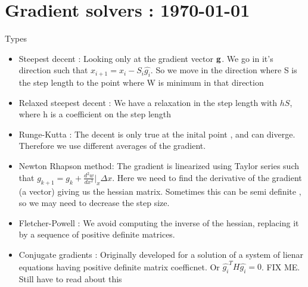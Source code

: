 




	\tableofcontents
	
\section{Gradient solvers : \today}

	\begin{frame}{Types}
		\begin{itemize}
			
			\item Steepest decent : Looking only at the gradient vector $\mathbf{g}$. We go in it's direction such that $ x_{i+1} = x_i - S_i \hat{g_i}$. So we move in the direction where S is the step length to the point where W is minimum in that direction
			\item Relaxed steepest decent : We have a relaxation in the step length with $hS$, where h is a coefficient on the step length
			\item Runge-Kutta : The decent is only true at the inital point , and can diverge. Therefore we use different averages of the gradient.
			\item Newton Rhapson method: The gradient is linearized using Taylor series such that $g_{k+1} = g_k + \frac{d^{2} w}{dx^{2}}|_x \Delta x$. Here we need to find the derivative of the gradient (a vector) giving us the hessian matrix. Sometimes this can be semi definite , so we may need to decrease the step size. 
			\item Fletcher-Powell : We avoid computing the inverse of the hessian, replacing it by a sequence of positive definite matrices. 
			\item Conjugate gradients : Originally developed for a solution of a system of lienar equations having positive definite matrix coefficnet. Or $\hat{g_i}^{T}H\hat{g_i} = 0$. FIX ME. Still have to read about this
		\end{itemize}
	\end{frame}


